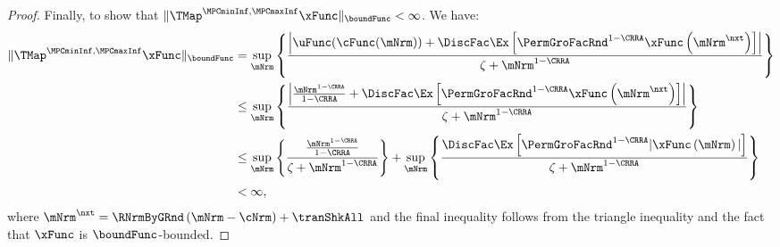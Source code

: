 \documentclass[\econtexRoot/BufferStockTheory]{subfiles}
\begin{document}
\begin{proof}
Finally, to show that $\Vert \TMap^{\MPCminInf, \MPCmaxInf}{\mathfrak{\xFunc}}\Vert_{\boundFunc}<\infty$.
We have:
%
%
\begin{equation}\begin{gathered}\begin{aligned}
\Vert \TMap^{\MPCminInf, \MPCmaxInf}{\mathfrak{\xFunc}}\Vert_{\boundFunc} & = \sup_{\mNrm} \left\{\frac{\left| \uFunc(\cFunc(\mNrm)) + \DiscFac \Ex\left[ {\PermGroFacRnd}^{1-\CRRA }{\mathfrak{\xFunc}} \left( {\mNrm^{\nxt}}\right) \right] \right|}{\zeta + \mNrm^{1-\CRRA}}\right\} \\
& \leq  \sup_{\mNrm} \left\{\frac{\left| \frac{\mNrm^{1-\CRRA}}{1-\CRRA} + \DiscFac \Ex\left[ {\PermGroFacRnd}^{1-\CRRA }{\mathfrak{\xFunc}} \left( {\mNrm^{\nxt}}\right) \right] \right|}{\zeta + \mNrm^{1-\CRRA}}\right\} \\ 
& \leq \sup_{\mNrm} \left\{\frac{\frac{\mNrm^{1-\CRRA}}{1-\CRRA}}{\zeta + \mNrm^{1-\CRRA}}\right\} + \sup_{\mNrm} \left\{\frac{\DiscFac \Ex\left[ {\PermGroFacRnd}^{1-\CRRA }{\vert \mathfrak{\xFunc}} \left( {\mNrm}\right)\vert  \right]}{\zeta + \mNrm^{1-\CRRA}}\right\}\\
& <\infty, 
\end{aligned}\end{gathered}\end{equation}
%
where ${\mNrm}^{\nxt} = \RNrmByGRnd\left(\mNrm - \cNrm\right) + \tranShkAll$ and the final inequality follows from the triangle inequality and the fact that $\xFunc$ is $\boundFunc$-bounded.

                                           
\end{proof}
\end{document}
